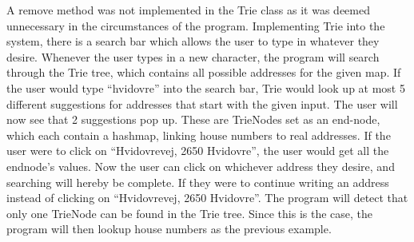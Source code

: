 A remove method was not implemented in the Trie class as it was deemed unnecessary in the circumstances of the program. 
\newline
Implementing Trie into the system, there is a search bar which allows the user to type in whatever they desire. Whenever the user types in a new character, the program will search through the Trie tree, which contains all possible addresses for the given map.
\newline
If the user would type “hvidovre” into the search bar, Trie would look up at most 5 different suggestions for addresses that start with the given input. The user will now see that 2 suggestions pop up. These are TrieNodes set as an end-node, which each contain a hashmap, linking house numbers to real addresses.
If the user were to click on “Hvidovrevej, 2650 Hvidovre”, the user would get all the endnode’s values. 
Now the user can click on whichever address they desire, and searching will hereby be complete. 
\newline
If they were to continue writing an address instead of clicking on “Hvidovrevej, 2650 Hvidovre”. The program will detect that only one TrieNode can be found in the Trie tree. Since this is the case, the program will then lookup house numbers as the previous example.
